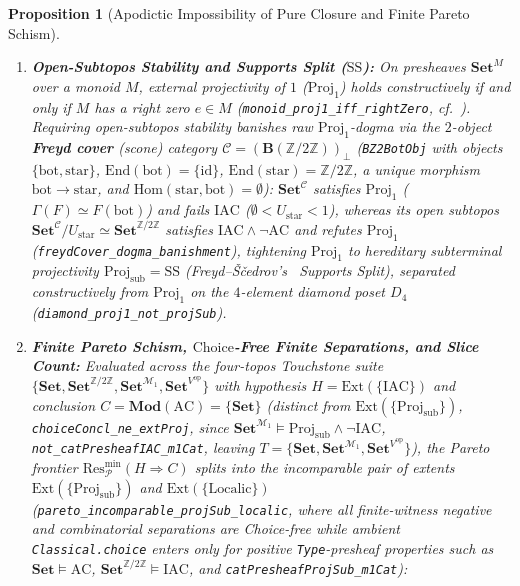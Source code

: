 \documentclass[10pt,twoside,openright]{book}
\theoremstyle{crmplain}
\newtheorem{proposition}[theorem]{Proposition}
\theoremstyle{crmdef}
\theoremstyle{crmremark}
\begin{document}
\begin{proposition}[Apodictic Impossibility of Pure Closure and Finite Pareto Schism]
\begin{enumerate}[label=\textup{(\roman*)},leftmargin=2.0em]
  \item \textbf{Open-Subtopos Stability and Supports Split ($\mathrm{SS}$):} On presheaves $\mathbf{Set}^M$ over a monoid $M$, external projectivity of $1$ ($\mathrm{Proj}_1$) holds constructively if and only if $M$ has a right zero $e \in M$ (\texttt{monoid\_\allowbreak proj1\_\allowbreak iff\_\allowbreak rightZero}, cf.~\cite{HemelaerRogers21}). Requiring open-subtopos stability banishes raw $\mathrm{Proj}_1$-dogma via the $2$-object \textbf{Freyd cover} (scone) category $\mathcal{C} = (\mathbf{B}(\mathbb{Z}/2\mathbb{Z}))_\bot$ (\texttt{BZ2BotObj} with objects $\{\mathrm{bot}, \mathrm{star}\}$, $\mathrm{End}(\mathrm{bot}) = \{\mathrm{id}\}$, $\mathrm{End}(\mathrm{star}) = \mathbb{Z}/2\mathbb{Z}$, a unique morphism $\mathrm{bot} \to \mathrm{star}$, and $\mathrm{Hom}(\mathrm{star}, \mathrm{bot}) = \emptyset$): $\mathbf{Set}^{\mathcal{C}}$ satisfies $\mathrm{Proj}_1$ ($\Gamma(F) \simeq F(\mathrm{bot})$) and fails $\mathrm{IAC}$ ($\emptyset < U_{\mathrm{star}} < 1$), whereas its open subtopos $\mathbf{Set}^{\mathcal{C}}/U_{\mathrm{star}} \simeq \mathbf{Set}^{\mathbb{Z}/2\mathbb{Z}}$ satisfies $\mathrm{IAC} \wedge \neg\mathrm{AC}$ and refutes $\mathrm{Proj}_1$ (\texttt{freydCover\_\allowbreak dogma\_\allowbreak banishment}), tightening $\mathrm{Proj}_1$ to hereditary subterminal projectivity $\mathrm{Proj}_{\mathrm{sub}} = \mathrm{SS}$ (Freyd--{\v{S}}{\v{c}}edrov's~\cite{FreydScedrov90} \emph{Supports Split}), separated constructively from $\mathrm{Proj}_1$ on the $4$-element diamond poset $D_4$ (\texttt{diamond\_\allowbreak proj1\_\allowbreak not\_\allowbreak projSub}).
  \item \textbf{Finite Pareto Schism, $\mathrm{Choice}$-Free Finite Separations, and Slice Count:} Evaluated across the four-topos Touchstone suite $\{\mathbf{Set},\allowbreak \mathbf{Set}^{\mathbb{Z}/2\mathbb{Z}},\allowbreak \mathbf{Set}^{\mathcal{M}_1},\allowbreak \mathbf{Set}^{V^{\mathrm{op}}}\}$ with hypothesis $H = \mathrm{Ext}(\{\mathrm{IAC}\})$ and conclusion $C = \mathbf{Mod}(\mathrm{AC}) = \{\mathbf{Set}\}$ (distinct from $\mathrm{Ext}(\{\mathrm{Proj}_{\mathrm{sub}}\})$, \texttt{choiceConcl\_\allowbreak ne\_\allowbreak extProj}, since $\mathbf{Set}^{\mathcal{M}_1} \models \mathrm{Proj}_{\mathrm{sub}} \wedge \neg\mathrm{IAC}$, \texttt{not\_\allowbreak catPresheafIAC\_\allowbreak m1Cat}, leaving $T = \{\mathbf{Set},\allowbreak \mathbf{Set}^{\mathcal{M}_1},\allowbreak \mathbf{Set}^{V^{\mathrm{op}}}\}$), the Pareto frontier $\mathrm{Res}_{\mathcal{P}}^{\min}(H \Rightarrow C)$ splits into the incomparable pair of extents $\mathrm{Ext}(\{\mathrm{Proj}_{\mathrm{sub}}\})$ and $\mathrm{Ext}(\{\mathrm{Localic}\})$ (\texttt{pareto\_\allowbreak incomparable\_\allowbreak projSub\_\allowbreak localic}, where all finite-witness negative and combinatorial separations are Choice-free while ambient \texttt{Classical.choice} enters only for positive \texttt{Type}-presheaf properties such as $\mathbf{Set} \models \mathrm{AC}$, $\mathbf{Set}^{\mathbb{Z}/2\mathbb{Z}} \models \mathrm{IAC}$, and \texttt{catPresheafProjSub\_\allowbreak m1Cat}):

\end{enumerate}
\end{proposition}
\end{document}
